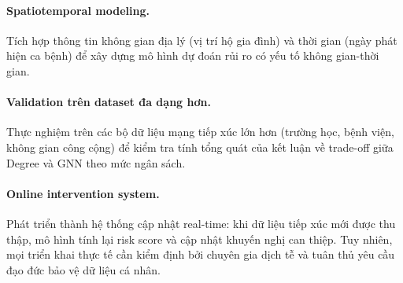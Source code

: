 \documentclass[12pt,a4paper]{report}
\theoremstyle{definition}
\begin{document}
\paragraph{Spatiotemporal modeling.} Tích hợp thông tin không gian địa lý (vị trí hộ gia đình) và thời gian (ngày phát hiện ca bệnh) để xây dựng mô hình dự đoán rủi ro có yếu tố không gian-thời gian.

\paragraph{Validation trên dataset đa dạng hơn.} Thực nghiệm trên các bộ dữ liệu mạng tiếp xúc lớn hơn (trường học, bệnh viện, không gian công cộng) để kiểm tra tính tổng quát của kết luận về trade-off giữa Degree và GNN theo mức ngân sách.

\paragraph{Online intervention system.} Phát triển thành hệ thống cập nhật real-time: khi dữ liệu tiếp xúc mới được thu thập, mô hình tính lại risk score và cập nhật khuyến nghị can thiệp. Tuy nhiên, mọi triển khai thực tế cần kiểm định bởi chuyên gia dịch tễ và tuân thủ yêu cầu đạo đức bảo vệ dữ liệu cá nhân.
\end{document}
